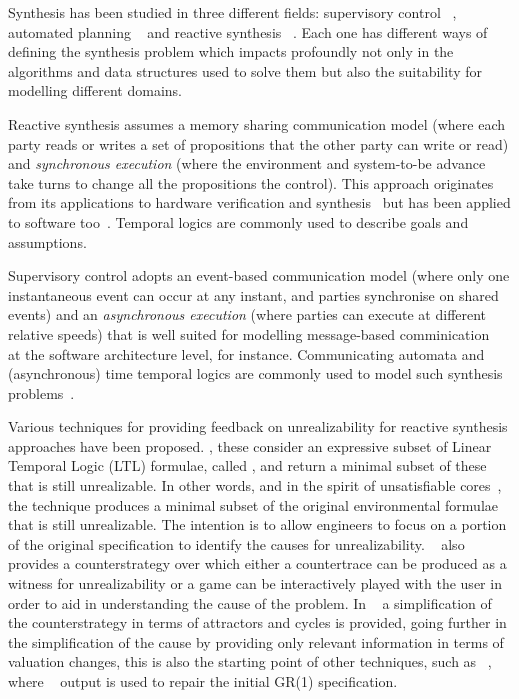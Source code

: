 Synthesis has been studied in three different fields: supervisory control 
~\cite{ramadge:1989}, automated planning ~\cite{CITA MAS ANTIGUA NO DE FOND 
PLANNING daniele:2000} and reactive synthesis ~\cite{Maoz:2014,Bloem:2012, 
CITAFUNDACIONAL}.  Each one has different ways of defining the synthesis problem 
which impacts profoundly not only in the algorithms and data structures used to solve 
them but also the suitability for modelling different domains. 

Reactive 
synthesis assumes   a memory sharing  communication model (where each party reads 
or writes a set of propositions that the other party can write or read) and 
\textit{synchronous execution} (where the environment and system-to-be advance 
take turns to change all the propositions the control). This approach 
originates from its applications to hardware verification and synthesis~\cite{} but has 
been applied to software too~\cite{}. Temporal logics 
are commonly used to describe goals and assumptions. 

Supervisory control adopts an event-based communication model (where only one 
instantaneous event can occur at any instant, and parties synchronise on shared 
events) and an \textit{asynchronous execution} (where parties can execute at 
different relative speeds) that is well suited for modelling message-based 
comminication~\cite{Hoare, Milner} at the software architecture level, for instance. 
Communicating automata  and (asynchronous) time temporal logics are commonly used 
to model such synthesis problems~\cite{incluir supervisory control aca}. 

Various techniques for providing feedback on unrealizability for reactive synthesis 
approaches have been proposed. \cite{DBLP:conf/fmcad/KonighoferHB09, 
DBLP:journals/scp/Schuppan12,DBLP:conf/fmcad/AlurMT13},
these consider an expressive subset of Linear Temporal 
Logic (LTL) formulae, called \gr, and return a minimal subset of these that is still 
unrealizable. In other words, and in the spirit of unsatisfiable cores~\cite{Torlak:2008}, 
the technique produces a minimal subset of the original environmental formulae that is 
still unrealizable. The intention is to allow engineers to focus on a portion of the original 
specification to identify the causes for unrealizability. 
~\cite{DBLP:conf/fmcad/KonighoferHB09} also provides a counterstrategy over which 
either a countertrace can be produced as a witness for unrealizability or a game can be 
interactively played with the user in order to aid in understanding the cause of the 
problem. In ~\cite{DBLP:conf/sigsoft/KuventMR17} a simplification of the 
counterstrategy in terms of attractors and cycles is provided, going further in the 
simplification of the cause by providing only relevant information in terms of valuation 
changes, this is also the starting point of other techniques, such as 
~\cite{maoz2019symbolic}, where ~\cite{DBLP:conf/sigsoft/KuventMR17} output is 
used to repair the initial GR(1) specification.


